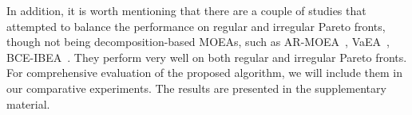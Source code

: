 In addition, 
it is worth mentioning that there are a couple of studies that attempted to balance the performance on regular and irregular Pareto fronts, though not being decomposition-based MOEAs, such as AR-MOEA~\cite{Tian2017}, VaEA~\cite{Xiang2016}, BCE-IBEA~\cite{Li2016}. 
They perform very well on both regular and irregular Pareto fronts. 
For comprehensive evaluation of the proposed algorithm, we will include them in our comparative experiments. The results are presented in the supplementary material. 



  

